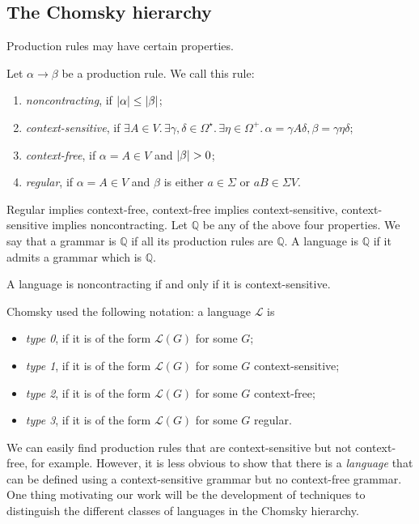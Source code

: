 \subsection{The Chomsky hierarchy}
Production rules may have certain properties.
\begin{definition}
	Let \( \alpha \to \beta \) be a production rule.
	We call this rule:
	\begin{enumerate}
		\item \emph{noncontracting}, if \( \abs{\alpha} \leq \abs{\beta} \);
		\item \emph{context-sensitive}, if \( \exists A \in V.\, \exists \gamma,\delta \in \Omega^\star.\, \exists \eta \in \Omega^+.\, \alpha = \gamma A \delta, \beta = \gamma \eta \delta \);
		\item \emph{context-free}, if \( \alpha = A \in V \) and \( \abs{\beta} > 0 \);
		\item \emph{regular}, if \( \alpha = A \in V \) and \( \beta \) is either \( a \in \Sigma \) or \( aB \in \Sigma V \).
	\end{enumerate}
	Regular implies context-free, context-free implies context-sensitive, context-sensitive implies noncontracting.
	Let \( \mathbb Q \) be any of the above four properties.
	We say that a grammar is \( \mathbb Q \) if all its production rules are \( \mathbb Q \).
	A language is \( \mathbb Q \) if it admits a grammar which is \( \mathbb Q \).
\end{definition}
\begin{theorem}[Chomsky]
	A language is noncontracting if and only if it is context-sensitive.
\end{theorem}
Chomsky used the following notation: a language \( \mathcal L \) is
\begin{itemize}
	\item \emph{type 0}, if it is of the form \( \mathcal L(G) \) for some \( G \);
	\item \emph{type 1}, if it is of the form \( \mathcal L(G) \) for some \( G \) context-sensitive;
	\item \emph{type 2}, if it is of the form \( \mathcal L(G) \) for some \( G \) context-free;
	\item \emph{type 3}, if it is of the form \( \mathcal L(G) \) for some \( G \) regular.
\end{itemize}
We can easily find production rules that are context-sensitive but not context-free, for example.
However, it is less obvious to show that there is a \emph{language} that can be defined using a context-sensitive grammar but no context-free grammar.
One thing motivating our work will be the development of techniques to distinguish the different classes of languages in the Chomsky hierarchy.

